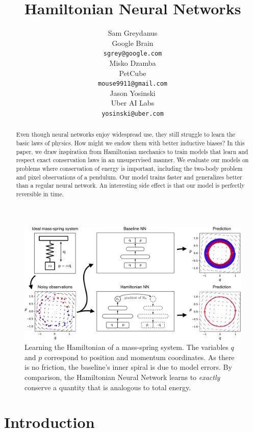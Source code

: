 \documentclass{article}
\title{Hamiltonian Neural Networks}
\author{%
  Sam Greydanus \\
  Google Brain\\
  \texttt{sgrey@google.com} \\
   \And
   Misko Dzamba \\
   PetCube \\
   \texttt{mouse9911@gmail.com} \\
   \And
   Jason Yosinski \\
   Uber AI Labs \\
   \texttt{yosinski@uber.com} \\
}
\begin{document}
\maketitle

\begin{abstract}
  Even though neural networks enjoy widespread use, they still struggle to learn the basic laws of physics. How might we endow them with better inductive biases? In this paper, we draw inspiration from Hamiltonian mechanics to train models that learn and respect exact conservation laws in an unsupervised manner. We evaluate our models on problems where conservation of energy is important, including the two-body problem and pixel observations of a pendulum. Our model trains faster and generalizes better than a regular neural network. An interesting side effect is that our model is perfectly reversible in time.
\end{abstract}

\begin{figure}[h!]
\centering
\includegraphics[width=\textwidth]{static/overall-idea}
\caption{
  Learning the Hamiltonian of a mass-spring system. The variables $q$ and $p$ correspond to position and momentum coordinates. As there is no friction, the baseline's inner spiral is due to model errors. By comparison, the Hamiltonian Neural Network learns to \textit{exactly} conserve a quantity that is analogous to total energy.}
\end{figure}


\section{Introduction} 

\end{document}
